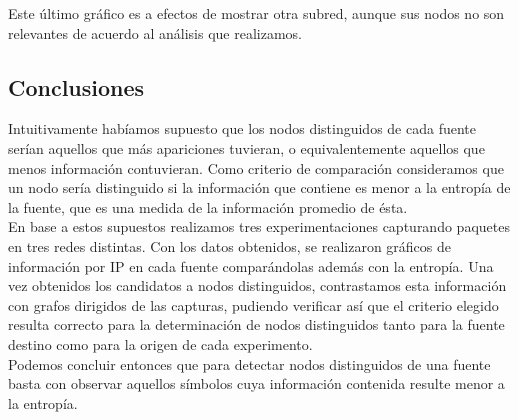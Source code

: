 \indent Este último gráfico es a efectos de mostrar otra subred, aunque sus nodos no son relevantes de acuerdo al análisis que realizamos.\\


\subsection{Conclusiones}

\indent \indent Intuitivamente habíamos supuesto que los nodos distinguidos de cada fuente serían aquellos que más apariciones tuvieran, o equivalentemente aquellos que menos información contuvieran. Como criterio de comparación consideramos que un nodo sería distinguido si la información que contiene es menor a la entropía de la fuente, que es una medida de la información promedio de ésta.\\
\indent En base a estos supuestos realizamos tres experimentaciones capturando paquetes en tres redes distintas. Con los datos obtenidos, se realizaron gráficos de información por IP en cada fuente comparándolas además con la entropía. Una vez obtenidos los candidatos a nodos distinguidos, contrastamos esta información con grafos dirigidos de las capturas, pudiendo verificar así que el criterio elegido resulta correcto para la determinación de nodos distinguidos tanto para la fuente destino como para la origen de cada experimento.\\
\indent Podemos concluir entonces que para detectar nodos distinguidos de una fuente basta con observar aquellos símbolos cuya información contenida resulte menor a la entropía.\\ 